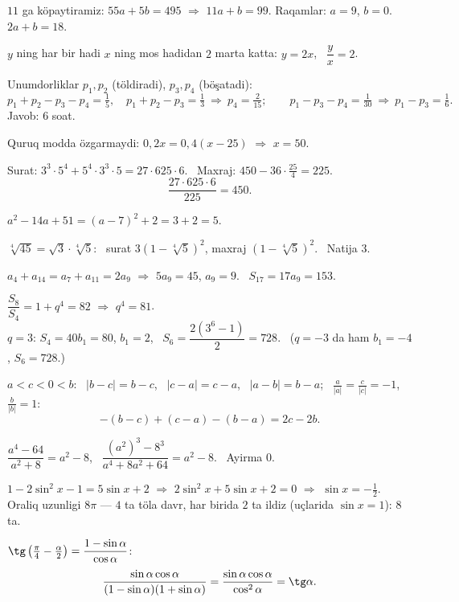 




$11$ ga köpaytiramiz: $55a+5b=495$ $\Rightarrow$ $11a+b=99$. Raqamlar: $a=9$, $b=0$. \ $2a+b=18$.

$y$ ning har bir hadi $x$ ning mos hadidan $2$ marta katta: $y=2x$, \ $\dfrac yx=2$.

Unumdorliklar $p_1,p_2$ (töldiradi), $p_3,p_4$ (böşatadi):
\[p_1+p_2-p_3-p_4=\tfrac15,\quad p_1+p_2-p_3=\tfrac13\ \Rightarrow\ p_4=\tfrac2{15};\qquad p_1-p_3-p_4=\tfrac1{30}\ \Rightarrow\ p_1-p_3=\tfrac16.\]
Javob: $6$ soat.

Quruq modda özgarmaydi: $0{,}2x=0{,}4(x-25)$ $\Rightarrow$ $x=50$.

Surat: $3^3\cdot5^4+5^4\cdot3^3\cdot5=27\cdot625\cdot6$. \ Maxraj: $450-36\cdot\frac{25}4=225$.
\[\frac{27\cdot625\cdot6}{225}=450.\]

$a^2-14a+51=(a-7)^2+2=3+2=5$.

$\sqrt[4]{45}=\sqrt3\cdot\sqrt[4]5$: \ surat $3\left(1-\sqrt[4]5\right)^2$, maxraj $\left(1-\sqrt[4]5\right)^2$. \ Natija $3$.

$a_4+a_{14}=a_7+a_{11}=2a_9$ $\Rightarrow$ $5a_9=45$, $a_9=9$. \ $S_{17}=17a_9=153$.

$\dfrac{S_8}{S_4}=1+q^4=82$ $\Rightarrow$ $q^4=81$.\\
$q=3$: $S_4=40b_1=80$, $b_1=2$, \ $S_6=\dfrac{2\left(3^6-1\right)}2=728$. \ ($q=-3$ da ham $b_1=-4$, $S_6=728$.)

$a<c<0<b$: \ $|b-c|=b-c$, \ $|c-a|=c-a$, \ $|a-b|=b-a$; \ $\frac a{|a|}=\frac c{|c|}=-1$, $\frac b{|b|}=1$:
\[-(b-c)+(c-a)-(b-a)=2c-2b.\]

$\dfrac{a^4-64}{a^2+8}=a^2-8$, \ $\dfrac{\left(a^2\right)^3-8^3}{a^4+8a^2+64}=a^2-8$. \ Ayirma $0$.

$1-2\sin^2x-1=5\sin x+2$ $\Rightarrow$ $2\sin^2x+5\sin x+2=0$ $\Rightarrow$ $\sin x=-\frac12$.\\
Oraliq uzunligi $8\pi$ — $4$ ta töla davr, har birida $2$ ta ildiz (uçlarida $\sin x=1$): $8$ ta.

$\tg\left(\frac\pi4-\frac\alpha2\right)=\dfrac{1-\sin\alpha}{\cos\alpha}$:
\[\frac{\sin\alpha\cos\alpha}{(1-\sin\alpha)(1+\sin\alpha)}=\frac{\sin\alpha\cos\alpha}{\cos^2\alpha}=\tg\alpha.\]

